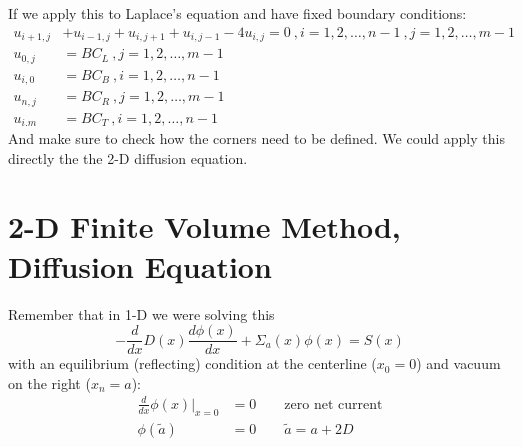 \documentclass[12pt]{article}
\begin{document}
If we apply this to Laplace's equation and have fixed boundary conditions:
%
\begin{align}
u_{i+1,j} &+ u_{i-1,j} + u_{i,j+1} + u_{i,j-1} - 4u_{i,j} = 0 \:, i = 1, 2, \dots, n-1 \:, j = 1, 2, \dots, m-1 \nonumber \\
%
u_{0,j} &= BC_L \:, j = 1, 2, \dots, m-1 \nonumber \\
u_{i,0} &= BC_B \:, i = 1, 2, \dots, n-1 \nonumber \\
u_{n,j} &= BC_R \:, j = 1, 2, \dots, m-1 \nonumber \\
u_{i.m} &= BC_T \:, i = 1, 2, \dots, n-1 \nonumber
\end{align}
%
And make sure to check how the corners need to be defined. We could apply this directly the the 2-D diffusion equation.

\section{2-D Finite Volume Method, Diffusion Equation}

Remember that in 1-D we were solving this
\[-\frac{d}{dx}D(x)\frac{d \phi(x)}{dx} + \Sigma_a(x) \phi(x) = S(x)\]
%
with an equilibrium (reflecting) condition at the centerline ($x_0 = 0$) and vacuum on the right ($x_n = a$):
\begin{align}
\frac{d}{dx}\phi(x) \big|_{x=0} &= 0 \qquad \text{zero net current} \nonumber\\
\phi(\tilde{a}) &= 0 \qquad \tilde{a} = a + 2D \nonumber
\end{align}
\end{document}
